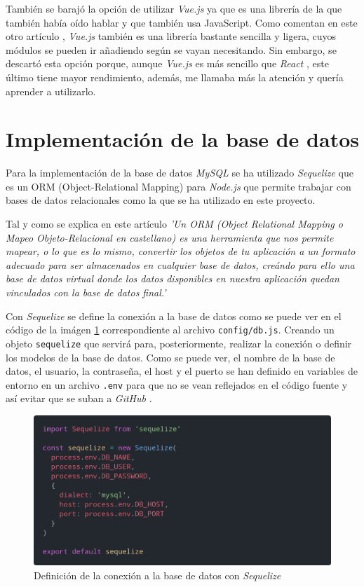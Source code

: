También se barajó la opción de utilizar \textit{Vue.js} \cite{vuejs} ya que es una
librería de la que también había oído hablar y que también usa JavaScript.
Como comentan en este otro artículo \cite{vuejs-vs-react}, \textit{Vue.js} \cite{vuejs}
también es una librería bastante sencilla y ligera, cuyos módulos se pueden ir añadiendo
según se vayan necesitando. Sin embargo, se descartó esta opción porque, aunque
\textit{Vue.js} \cite{vuejs} es más sencillo que \textit{React} \cite{react}, este
último tiene mayor rendimiento, además, me llamaba más la atención y quería aprender a
utilizarlo.


\section{Implementación de la base de datos}
Para la implementación de la base de datos \textit{MySQL} \cite{mysql} se ha utilizado
\textit{Sequelize} \cite{sequelize} que es un ORM (Object-Relational Mapping) para
\textit{Node.js} \cite{nodejs} que permite trabajar con bases de datos relacionales
como la que se ha utilizado en este proyecto.

Tal y como se explica en este artículo \cite{orm} \textit{'Un ORM (Object Relational
Mapping o Mapeo Objeto-Relacional en castellano) es una herramienta que nos permite mapear, o lo
que es lo mismo, convertir los objetos de tu aplicación a un formato adecuado para ser
almacenados en cualquier base de datos, creándo para ello una base de datos virtual
donde los datos disponibles en nuestra aplicación quedan vinculados con la base de datos
final.'}

Con \textit{Sequelize} \cite{sequelize} se define la conexión a la base de datos como se
puede ver en el código de la imágen \ref{fig:sequelize-db} correspondiente al archivo
\texttt{config/db.js}. Creando un objeto \texttt{sequelize} que servirá para,
posteriormente, realizar la conexión o definir los modelos de la base de datos. Como se
puede ver, el nombre de la base de datos, el usuario, la contraseña, el host y el puerto
se han definido en variables de entorno en un archivo \texttt{.env} para que no se vean
reflejados en el código fuente y así evitar que se suban a \textit{GitHub} \cite{github}.

\begin{figure}[H]
  \centering
  \includegraphics[width=1\textwidth]{img/sequelize-db}
  \caption{Definición de la conexión a la base de datos con \textit{Sequelize}}
  \label{fig:sequelize-db}
\end{figure}

